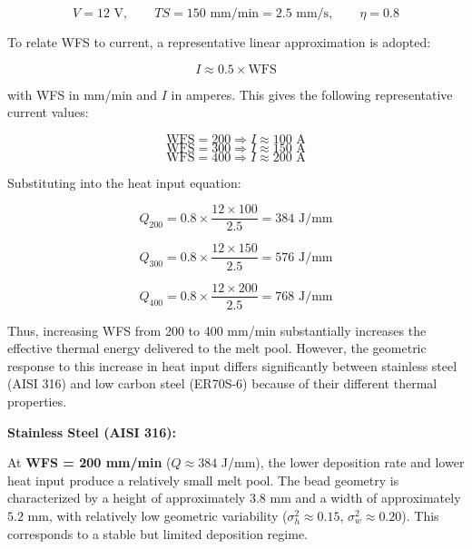 \documentclass[conference]{IEEEtran}
\begin{document}
\begin{equation}
V = 12 \text{ V}, \qquad TS = 150 \text{ mm/min} = 2.5 \text{ mm/s}, \qquad \eta = 0.8
\end{equation}

To relate WFS to current, a representative linear approximation is adopted:

\begin{equation}
I \approx 0.5 \times \mathrm{WFS}
\end{equation}

with WFS in mm/min and $I$ in amperes. This gives the following representative current values:

\begin{equation}
\mathrm{WFS}=200 \Rightarrow I \approx 100 \text{ A}
\end{equation}
\begin{equation}
\mathrm{WFS}=300 \Rightarrow I \approx 150 \text{ A}
\end{equation}
\begin{equation}
\mathrm{WFS}=400 \Rightarrow I \approx 200 \text{ A}
\end{equation}

Substituting into the heat input equation:

\begin{equation}
Q_{200} = 0.8 \times \frac{12 \times 100}{2.5} = 384 \text{ J/mm}
\end{equation}

\begin{equation}
Q_{300} = 0.8 \times \frac{12 \times 150}{2.5} = 576 \text{ J/mm}
\end{equation}

\begin{equation}
Q_{400} = 0.8 \times \frac{12 \times 200}{2.5} = 768 \text{ J/mm}
\end{equation}

Thus, increasing WFS from 200 to 400 mm/min substantially increases the effective thermal energy delivered to the melt pool. However, the geometric response to this increase in heat input differs significantly between stainless steel (AISI 316) and low carbon steel (ER70S-6) because of their different thermal properties.


\textbf{Stainless Steel (AISI 316):}

At \textbf{WFS = 200 mm/min} ($Q \approx 384$ J/mm), the lower deposition rate and lower heat input produce a relatively small melt pool. The bead geometry is characterized by a height of approximately $3.8$ mm and a width of approximately $5.2$ mm, with relatively low geometric variability ($\sigma_h^2 \approx 0.15$, $\sigma_w^2 \approx 0.20$). This corresponds to a stable but limited deposition regime.
\end{document}
